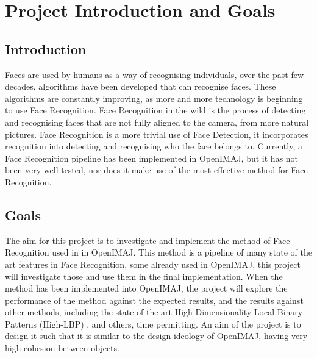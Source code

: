 \documentclass[12pt, a4paper]{article}
\begin{document}
        \newpage
       
 
 
       
        \tableofcontents
       
 
 
        \newpage
 \section{Project Introduction and Goals}
 \subsection{Introduction}
 Faces are used by humans as a way of recognising individuals, over the past few decades, algorithms have been developed that can recognise faces. These algorithms are constantly improving, as more and more technology is beginning to use Face Recognition. Face Recognition in the wild is the process of detecting and recognising faces that are not fully aligned to the camera, from more natural pictures. Face Recognition is a more trivial use of Face Detection, it incorporates recognition into detecting and recognising who the face belongs to. Currently, a Face Recognition pipeline has been implemented in OpenIMAJ, but it has not been very well tested, nor does it make use of the most effective method for Face Recognition.

 \subsection{Goals}
The aim for this project is to investigate and implement the method of Face Recognition used in \cite{simonyan2004fisher} in OpenIMAJ. This method is a pipeline of many state of the art features in Face Recognition, some already used in OpenIMAJ, this project will investigate those and use them in the final implementation. When the method has been implemented into OpenIMAJ, the project will explore the performance of the method against the expected results, and the results against other methods, including the state of the art High Dimensionality Local Binary Patterns (High-LBP) \cite{highlbpsift}, and others, time permitting. An aim of the project is to design it such that it is similar to the design ideology of OpenIMAJ, having very high cohesion between objects.
\end{document}
